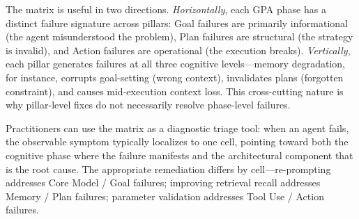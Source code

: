 \begin{table}[htbp]
\centering
\caption{Phase--Pillar Failure Matrix: characteristic failure modes at each intersection of cognitive phase and architectural pillar. Each cell describes the dominant failure that emerges when that pillar degrades during that phase.}
\label{tab:phase_pillar}
\end{table}

The matrix is useful in two directions. \emph{Horizontally}, each GPA phase has a distinct failure signature across pillars: Goal failures are primarily informational (the agent misunderstood the problem), Plan failures are structural (the strategy is invalid), and Action failures are operational (the execution breaks). \emph{Vertically}, each pillar generates failures at all three cognitive levels---memory degradation, for instance, corrupts goal-setting (wrong context), invalidates plans (forgotten constraint), and causes mid-execution context loss. This cross-cutting nature is why pillar-level fixes do not necessarily resolve phase-level failures.

Practitioners can use the matrix as a diagnostic triage tool: when an agent fails, the observable symptom typically localizes to one cell, pointing toward both the cognitive phase where the failure manifests and the architectural component that is the root cause. The appropriate remediation differs by cell---re-prompting addresses Core Model / Goal failures; improving retrieval recall addresses Memory / Plan failures; parameter validation addresses Tool Use / Action failures.